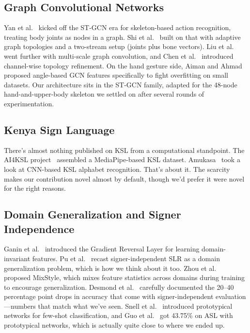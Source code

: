 \documentclass[conference]{IEEEtran}
\begin{document}
\subsection{Graph Convolutional Networks}

Yan et al.~\cite{yan2018stgcn} kicked off the ST-GCN era for skeleton-based action recognition, treating body joints as nodes in a graph. Shi et al.~\cite{shi2019twostreamAGCN} built on that with adaptive graph topologies and a two-stream setup (joints plus bone vectors). Liu et al.~\cite{liu2020msg3d} went further with multi-scale graph convolution, and Chen et al.~\cite{chen2021ctrgcn} introduced channel-wise topology refinement. On the hand gesture side, Aiman and Ahmad~\cite{aiman2023} proposed angle-based GCN features specifically to fight overfitting on small datasets. Our architecture sits in the ST-GCN family, adapted for the 48-node hand-and-upper-body skeleton we settled on after several rounds of experimentation.

\subsection{Kenya Sign Language}

There's almost nothing published on KSL from a computational standpoint. The AI4KSL project~\cite{ai4ksl2024} assembled a MediaPipe-based KSL dataset. Amukasa~\cite{amukasa2021} took a look at CNN-based KSL alphabet recognition. That's about it. The scarcity makes our contribution novel almost by default, though we'd prefer it were novel for the right reasons.

\subsection{Domain Generalization and Signer Independence}

Ganin et al.~\cite{ganin2016domain} introduced the Gradient Reversal Layer for learning domain-invariant features. Pu et al.~\cite{pu2024signer} recast signer-independent SLR as a domain generalization problem, which is how we think about it too. Zhou et al.~\cite{zhou2021mixstyle} proposed MixStyle, which mixes feature statistics across domains during training to encourage generalization. Desmond et al.~\cite{desmond2024} carefully documented the 20--40 percentage point drops in accuracy that come with signer-independent evaluation---numbers that match what we've seen. Snell et al.~\cite{snell2017prototypical} introduced prototypical networks for few-shot classification, and Guo et al.~\cite{guo2024fewshot} got 43.75\% on ASL with prototypical networks, which is actually quite close to where we ended up.
\end{document}
